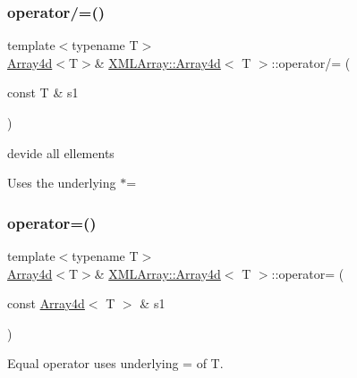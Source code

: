 \subsubsection{\texorpdfstring{operator/=()}{operator/=()}\hspace{0.1cm}{\footnotesize\ttfamily [6/6]}}
{\footnotesize\ttfamily template$<$typename T$>$ \\
\mbox{\hyperlink{classXMLArray_1_1Array4d}{Array4d}}$<$T$>$\& \mbox{\hyperlink{classXMLArray_1_1Array4d}{X\+M\+L\+Array\+::\+Array4d}}$<$ T $>$\+::operator/= (\begin{DoxyParamCaption}\item[{const T \&}]{s1 }\end{DoxyParamCaption})\hspace{0.3cm}{\ttfamily [inline]}}



devide all ellements 

Uses the underlying $\ast$= \mbox{\label{classXMLArray_1_1Array4d_a3231647c370f838502526de102af1b23}} 
\subsubsection{\texorpdfstring{operator=()}{operator=()}\hspace{0.1cm}{\footnotesize\ttfamily [1/6]}}
{\footnotesize\ttfamily template$<$typename T$>$ \\
\mbox{\hyperlink{classXMLArray_1_1Array4d}{Array4d}}$<$T$>$\& \mbox{\hyperlink{classXMLArray_1_1Array4d}{X\+M\+L\+Array\+::\+Array4d}}$<$ T $>$\+::operator= (\begin{DoxyParamCaption}\item[{const \mbox{\hyperlink{classXMLArray_1_1Array4d}{Array4d}}$<$ T $>$ \&}]{s1 }\end{DoxyParamCaption})\hspace{0.3cm}{\ttfamily [inline]}}



Equal operator uses underlying = of T. 

\mbox{\label{classXMLArray_1_1Array4d_a3231647c370f838502526de102af1b23}} 
